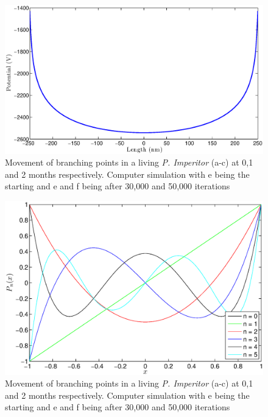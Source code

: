\documentclass[]{article}
\begin{document}
\begin{figure}
\centering
\includegraphics[width=\textwidth]{1d_Uniform_Potential.eps}
\caption{Movement of branching points in a living \emph{P. Imperitor} (a-c) at 0,1 and 2 months respectively.
Computer simulation with e being the starting and e and f being after 30,000 and 50,000 iterations \label{branching}}
\end{figure}

\begin{figure}
\centering
\includegraphics[width=\textwidth]{LegendrePolynomials.eps}
\caption{Movement of branching points in a living \emph{P. Imperitor} (a-c) at 0,1 and 2 months respectively.
Computer simulation with e being the starting and e and f being after 30,000 and 50,000 iterations \label{branching}}
\end{figure}
\end{document}
